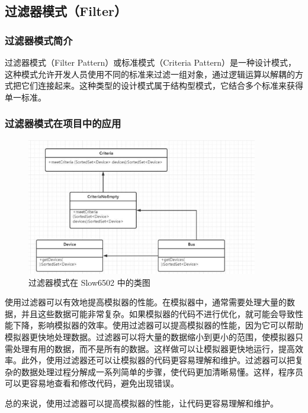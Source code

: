 \subsection{过滤器模式（Filter）}

\subsubsection{过滤器模式简介}

过滤器模式（Filter Pattern）或标准模式（Criteria Pattern）是一种设计模式，这种模式允许开发人员使用不同的标准来过滤一组对象，通过逻辑运算以解耦的方式把它们连接起来。这种类型的设计模式属于结构型模式，它结合多个标准来获得单一标准。

\subsubsection{过滤器模式在项目中的应用}

\begin{figure}[htb]
  \centering
  \includegraphics[width=0.9\textwidth]{figures/过滤器模式.pdf}
  \caption{过滤器模式在 Slow6502 中的类图}
\end{figure}

使用过滤器可以有效地提高模拟器的性能。在模拟器中，通常需要处理大量的数据，并且这些数据可能非常复杂。如果模拟器的代码不进行优化，就可能会导致性能下降，影响模拟器的效率。使用过滤器可以提高模拟器的性能，因为它可以帮助模拟器更快地处理数据。过滤器可以将大量的数据缩小到更小的范围，使模拟器只需处理有用的数据，而不是所有的数据。这样做可以让模拟器更快地运行，提高效率。此外，使用过滤器还可以让模拟器的代码更容易理解和维护。过滤器可以把复杂的数据处理过程分解成一系列简单的步骤，使代码更加清晰易懂。这样，程序员可以更容易地查看和修改代码，避免出现错误。

总的来说，使用过滤器可以提高模拟器的性能，让代码更容易理解和维护。

